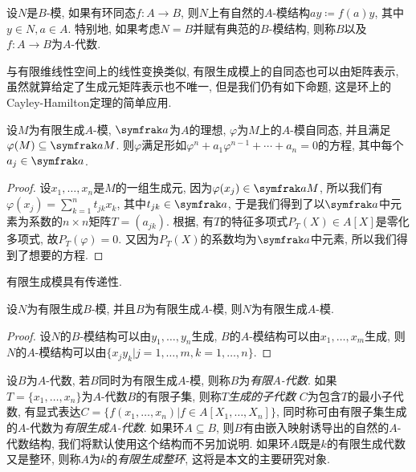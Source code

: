 设$N$是$B$-模, 如果有环同态$f\colon A\to B$, 则$N$上有自然的$A$-模结构$ay\coloneq f(a)y$, 其中$y\in N, a\in A$. 特别地, 如果考虑$N=B$并赋有典范的$B$-模结构, 则称$B$以及$f\colon A\to B$为$A$-代数.

与有限维线性空间上的线性变换类似, 有限生成模上的自同态也可以由矩阵表示, 虽然就算给定了生成元矩阵表示也不唯一, 但是我们仍有如下命题, 这是环上的Cayley-Hamilton定理的简单应用.

\begin{proposition}\label{prop:fgmoduleendomorphism}
  设$M$为有限生成$A$-模, $\ideal{a}$为$A$的理想, $\varphi$为$M$上的$A$-模自同态, 并且满足$\varphi(M)\subseteq \ideal{a}M$. 则$\varphi$满足形如$\varphi^n+a_1\varphi^{n-1}+\dotsb +a_n=0$的方程, 其中每个$a_j\in \ideal{a}$.
\end{proposition}

\begin{proof}
  设$x_1, \dotsc, x_n$是$M$的一组生成元, 因为$\varphi (x_j)\in \ideal{a}M$, 所以我们有$\varphi (x_j)=\sum_{k=1}^n t_{jk}x_k$, 其中$t_{jk}\in \ideal{a}$, 于是我们得到了以$\ideal{a}$中元素为系数的$n\times n$矩阵$T=(a_{jk})$. 根据, 有$T$的特征多项式$P_T(X)\in A[X]$是零化多项式, 故$P_T(\varphi)=0$. 又因为$P_T(X)$的系数均为$\ideal{a}$中元素, 所以我们得到了想要的方程.
\end{proof}

有限生成模具有传递性.

\begin{proposition}\label{prop:fgmodule}
  设$N$为有限生成$B$-模, 并且$B$为有限生成$A$-模, 则$N$为有限生成$A$-模.
\end{proposition}

\begin{proof}
  设$N$的$B$-模结构可以由$y_1, \dotsc, y_n$生成, $B$的$A$-模结构可以由$x_1, \dotsc, x_m$生成, 则$N$的$A$-模结构可以由$\{x_jy_k\vert j=1, \dotsc, m, k=1, \dotsc, n\}$.
\end{proof}

\begin{definition}
  设$B$为$A$-代数, 若$B$同时为有限生成$A$-模, 则称$B$为\emph{有限$A$-代数}. 如果$T=\{x_1, \dotsc, x_n\}$为$A$-代数$B$的有限子集, 则称$T$\emph{生成的子代数} $C$为包含$T$的最小子代数, 有显式表达$C=\{f(x_1, \dotsc, x_n)\vert f\in A[X_1, \dotsc, X_n]\}$, 同时称可由有限子集生成的$A$-代数为\emph{有限生成$A$-代数}. 如果环$A\subseteq B$, 则$B$有由嵌入映射诱导出的自然的$A$-代数结构, 我们将默认使用这个结构而不另加说明. 如果环$A$既是$k$的有限生成代数又是整环, 则称$A$为$k$的\emph{有限生成整环}, 这将是本文的主要研究对象.
\end{definition}

